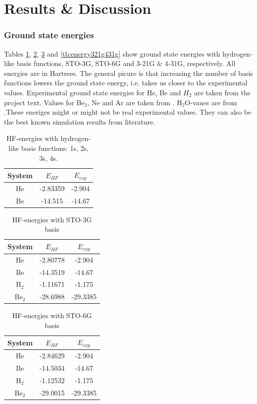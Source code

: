 \documentclass[a4paper,10pt, twocolumn, pre]{revtex4}
\begin{document}
\part{Results \& Discussion}

\section{Ground state energies}
Tables \ref{tb:energy_hydrogenlike}, \ref{tb:energy_sto3g}, \ref{tb:energy_sto6g} and \ref{tb:energy321g431g} show ground state energies with hydrogen-like basis functions, STO-3G, STO-6G and 3-21G \& 4-31G, respectively. All energies are in Hartrees. The general picure is that increasing the number of basis functions lowers the ground state energy, i.e. takes us closer to the experimental values. Experimental ground state energies for He, Be and $H_2$ are taken from the project text. Values for Be$_2$, Ne and Ar are taken from \cite{hogberget2013quantum}. H$_2$O-vaues are from \cite{Feller1987}.These eneriges might or might not be real experimental values. They can also be the best known simulation results from literature.



\begin{table}[h!tb]
\caption{HF-energies with hydrogen-like basis functions: 1s, 2s, 3s, 4s.}
\label{tb:energy_hydrogenlike}
\begin{tabular}[c]{c|c|c}
System & $E_{HF}$ & $E_{exp}$ \\
\hline
He & -2.83359 & -2.904 \\
Be & -14.515 & -14.67
\end{tabular}
\end{table}

\begin{table}[h!tb]
\caption{HF-energies with STO-3G basis}
\label{tb:energy_sto3g}
\begin{tabular}[c]{c|c|c}
System & $E_{HF}$ & $E_{exp}$ \\
\hline
He & -2.80778 & -2.904  \\
Be & -14.3519 & -14.67 \\
$\mbox{H}_2$ & -1.11671 & -1.175 \\
$\mbox{Be}_2$ & -28.6988 & -29.3385 \\
\end{tabular}
\end{table}

\begin{table}[h!tb]
\caption{HF-energies with STO-6G basis}
\label{tb:energy_sto6g}
\begin{tabular}[c]{c|c|c}
System & $E_{HF}$ & $E_{exp}$ \\
\hline
He & -2.84629 & -2.904 \\
Be & -14.5034 & -14.67 \\
$\mbox{H}_2$ & -1.12532 & -1.175 \\
$\mbox{Be}_2$ & -29.0015 & -29.3385 \\
\end{tabular}
\end{table}
\end{document}
